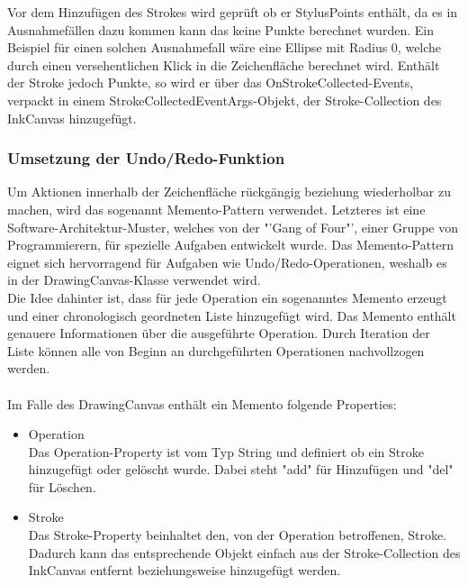 Vor dem Hinzufügen des Strokes wird geprüft ob er StylusPoints enthält, da es in Ausnahmefällen dazu kommen kann das keine Punkte berechnet wurden. Ein Beispiel für einen solchen Ausnahmefall wäre eine Ellipse mit Radius 0, welche durch einen versehentlichen Klick in die Zeichenfläche berechnet wird. Enthält der Stroke jedoch Punkte, so wird er über das OnStrokeCollected-Events, verpackt in einem StrokeCollectedEventArgs-Objekt, der Stroke-Collection des InkCanvas hinzugefügt. 

\subsubsection{Umsetzung der Undo/Redo-Funktion}
Um Aktionen innerhalb der Zeichenfläche rückgängig beziehung wiederholbar zu machen, wird das sogenannt Memento-Pattern verwendet. Letzteres ist eine Software-Architektur-Muster, welches von der "'Gang of Four"', einer Gruppe von Programmierern, für spezielle Aufgaben entwickelt wurde. Das Memento-Pattern eignet sich hervorragend für Aufgaben wie Undo/Redo-Operationen, weshalb es in der DrawingCanvas-Klasse verwendet wird.\\
Die Idee dahinter ist, dass für jede Operation ein sogenanntes Memento erzeugt und einer chronologisch geordneten Liste hinzugefügt wird. Das Memento enthält genauere Informationen über die ausgeführte Operation. Durch Iteration der Liste können alle von Beginn an durchgeführten Operationen nachvollzogen werden.\\
\\
Im Falle des DrawingCanvas enthält ein Memento folgende Properties:
\begin{itemize}
\item Operation\\
Das Operation-Property ist vom Typ String und definiert ob ein Stroke hinzugefügt oder gelöscht wurde. Dabei steht "add" für Hinzufügen und "del" für Löschen.
\item Stroke\\
Das Stroke-Property beinhaltet den, von der Operation betroffenen, Stroke. Dadurch kann das entsprechende Objekt einfach aus der Stroke-Collection des InkCanvas entfernt beziehungsweise hinzugefügt werden.
\end{itemize}

